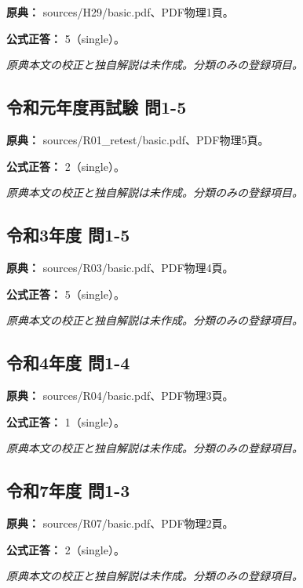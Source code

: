 \noindent\textbf{原典：} sources/H29/basic.pdf、PDF物理1頁。

\textbf{公式正答：} 5（single）。

\par\textit{原典本文の校正と独自解説は未作成。分類のみの登録項目。}

\subsection{令和元年度再試験 問1-5}
\label{q:r01-ret-basic-1-5}

\noindent\textbf{原典：} sources/R01\_retest/basic.pdf、PDF物理5頁。

\textbf{公式正答：} 2（single）。

\par\textit{原典本文の校正と独自解説は未作成。分類のみの登録項目。}

\subsection{令和3年度 問1-5}
\label{q:r03-reg-basic-1-5}

\noindent\textbf{原典：} sources/R03/basic.pdf、PDF物理4頁。

\textbf{公式正答：} 5（single）。

\par\textit{原典本文の校正と独自解説は未作成。分類のみの登録項目。}

\subsection{令和4年度 問1-4}
\label{q:r04-reg-basic-1-4}

\noindent\textbf{原典：} sources/R04/basic.pdf、PDF物理3頁。

\textbf{公式正答：} 1（single）。

\par\textit{原典本文の校正と独自解説は未作成。分類のみの登録項目。}

\subsection{令和7年度 問1-3}
\label{q:r07-reg-basic-1-3}

\noindent\textbf{原典：} sources/R07/basic.pdf、PDF物理2頁。

\textbf{公式正答：} 2（single）。

\par\textit{原典本文の校正と独自解説は未作成。分類のみの登録項目。}

